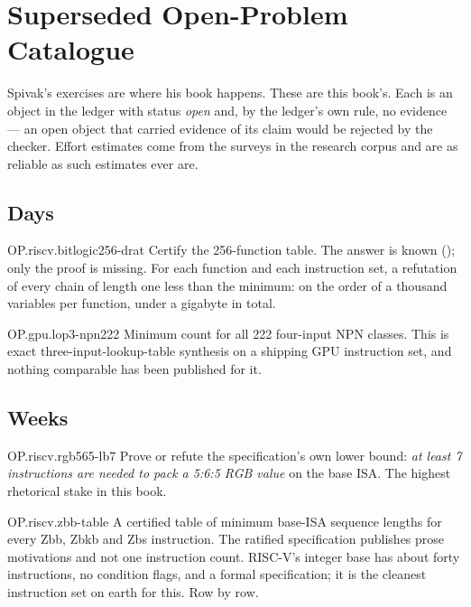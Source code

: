\chapter{Superseded Open-Problem Catalogue}
\label{ch:open}

Spivak's exercises are where his book happens. These are this book's. Each is an object in the ledger with status \emph{open} and, by the ledger's own rule, no evidence --- an open object that carried evidence of its claim would be rejected by the checker. Effort estimates come from the surveys in the research corpus and are as reliable as such estimates ever are.

\section{Days}

\begin{artifact}{OP.riscv.bitlogic256-drat}
Certify the 256-function table. The answer is known (); only the proof is missing. For each function and each instruction set, a refutation of every chain of length one less than the minimum: on the order of a thousand variables per function, under a gigabyte in total.
\end{artifact}

\begin{artifact}{OP.gpu.lop3-npn222}
Minimum  count for all 222 four-input NPN classes. This is exact three-input-lookup-table synthesis on a shipping GPU instruction set, and nothing comparable has been published for it.
\end{artifact}

\section{Weeks}

\begin{artifact}{OP.riscv.rgb565-lb7}
Prove or refute the specification's own lower bound: \emph{at least 7 instructions are needed to pack a 5:6:5 RGB value} on the base ISA. The highest rhetorical stake in this book.
\end{artifact}

\begin{artifact}{OP.riscv.zbb-table}
A certified table of minimum base-ISA sequence lengths for every Zbb, Zbkb and Zbs instruction. The ratified specification publishes prose motivations and not one instruction count. RISC-V's integer base has about forty instructions, no condition flags, and a formal specification; it is the cleanest instruction set on earth for this. Row by row.
\end{artifact}

